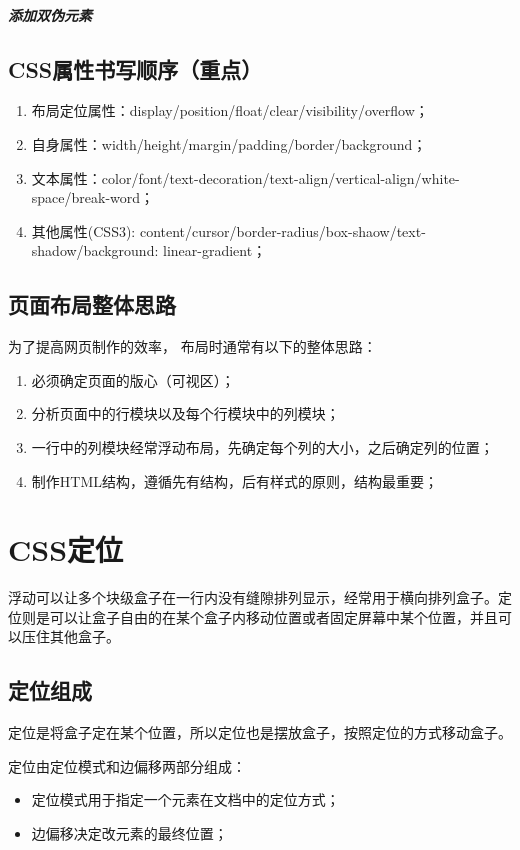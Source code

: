 \paragraph{添加双伪元素}
\section{CSS属性书写顺序（重点）}
\begin{enumerate}
    \item 布局定位属性：display/position/float/clear/visibility/overflow；
    \item 自身属性：width/height/margin/padding/border/background；
    \item 文本属性：color/font/text-decoration/text-align/vertical-align/white-space/break-word；
    \item 其他属性(CSS3): content/cursor/border-radius/box-shaow/text-shadow/background: linear-gradient；
\end{enumerate}
\section{页面布局整体思路}
为了提高网页制作的效率， 布局时通常有以下的整体思路：
\begin{enumerate}
    \item 必须确定页面的版心（可视区）；
    \item 分析页面中的行模块以及每个行模块中的列模块；
    \item 一行中的列模块经常浮动布局，先确定每个列的大小，之后确定列的位置；
    \item 制作HTML结构，遵循先有结构，后有样式的原则，结构最重要；
\end{enumerate}

\chapter{CSS定位}
浮动可以让多个块级盒子在一行内没有缝隙排列显示，经常用于横向排列盒子。定位则是可以让盒子自由的在某个盒子内移动位置或者固定屏幕中某个位置，并且可以压住其他盒子。
\section{定位组成}
定位是将盒子定在某个位置，所以定位也是摆放盒子，按照定位的方式移动盒子。

定位由定位模式和边偏移两部分组成：
\begin{itemize}
    \item 定位模式用于指定一个元素在文档中的定位方式；
    \item 边偏移决定改元素的最终位置；
\end{itemize}
